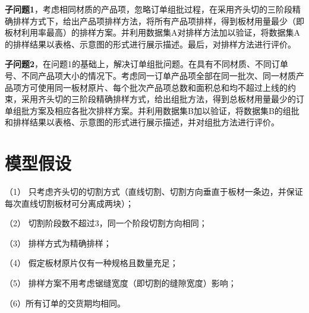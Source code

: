 \documentclass[bwprint]{gmcmthesis}
\begin{document}
\textbf{子问题1}，考虑相同材质的产品项，忽略订单组批过程，在采用齐头切的三阶段精确排样方式下，给出产品项排样方法，将所有产品项排样，得到板材用量最少（即板材利用率最高）的排样方案。并利用数据集A对排样方法加以验证，将数据集A的排样结果以表格、示意图的形式进行展示描述。最后，对排样方法进行评价。

\textbf{子问题2}，在问题1的基础上，解决订单组批问题。在具有不同材质、不同订单号、不同产品项大小的情况下。考虑同一订单产品项全部在同一批次、同一材质产品项方可使用同一板材原片、每个批次产品项总数和面积总和均不超过上线的约束，采用齐头切的三阶段精确排样方式，给出组批方法，得到总板材用量最少的订单组批方案及相应各批次排样方案。并利用数据集B加以验证，将数据集B的组批和排样结果以表格、示意图的形式进行展示描述，并对组批方法进行评价。

\newpage
\section{模型假设}


（1） 只考虑齐头切的切割方式（直线切割、切割方向垂直于板材一条边，并保证每次直线切割板材可分离成两块）；

（2） 切割阶段数不超过3，同一个阶段切割方向相同；

（3） 排样方式为精确排样；

（4） 假定板材原片仅有一种规格且数量充足；

（5） 排样方案不用考虑锯缝宽度（即切割的缝隙宽度）影响；

（6）所有订单的交货期均相同。

\quad
\end{document}
